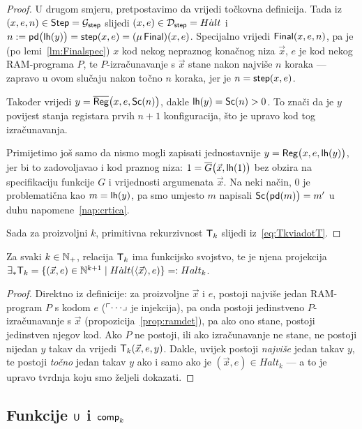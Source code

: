 \begin{proof}
U drugom smjeru, pretpostavimo da vrijedi točkovna definicija. Tada iz $(x,e,n)\in\mathsf{Step}=\mathcal G_{\mathsf{step}}$ slijedi $(x,e)\in\mathcal D_{\mathsf{step}}=H\dot alt$ i $n:=\mathsf{pd}\bigl(\mathsf{lh}(y)\bigr)=\mathsf{step}(x,e)=(\mu\,\mathsf{Final})(x,e)$. Specijalno vrijedi $\mathsf{Final}(x,e,n)$, pa je (po lemi~\ref{lm:Finalspec}) $x$ kod nekog nepraznog konačnog niza $\vec x$, $e$ je kod nekog RAM-programa $P$, te $P$-izračunavanje s $\vec x$ stane nakon najviše $n$ koraka --- zapravo u ovom slučaju nakon točno $n$ koraka, jer je $n=\mathsf{step}(x,e)$.

Također vrijedi $y=\overline{\mathsf{Reg}}\bigl(x,e,\mathsf{Sc}(n)\bigr)$, dakle $\mathsf{lh}(y)=\mathsf{Sc}(n)>0$. To znači da je $y$ povijest stanja registara prvih $n+1$ konfiguracija, što je upravo kod tog izračunavanja.

Primijetimo još samo da nismo mogli zapisati jednostavnije $y=\mathsf{Reg}\bigl(x,e,\mathsf{lh}(y)\bigr)$, jer bi to zadovoljavao i kod praznog niza: $1=\overline G\bigl(\vec x,\mathsf{lh}(1)\bigr)$ bez obzira na specifikaciju funkcije $G$ i vrijednosti argumenata $\vec x$. Na neki način, $0$ je problematična kao $m=\mathsf{lh}(y)$, pa smo umjesto $m$ napisali $\mathsf{Sc}\bigl(\mathsf{pd}(m)\bigr)=m'$ u duhu napomene~\ref{nap:crtica}.

Sada za proizvoljni $k$, primitivna rekurzivnost $\mathsf T_k$ slijedi iz~\eqref{eq:TkviadotT}.
\end{proof}

\begin{korolar}\label{kor:funHaltTk}
    Za svaki $k\in{\mathbb N}_+$, relacija $\mathsf T_k$ ima funkcijsko svojstvo, te je njena projekcija $\exists_*\mathsf T_k=\{(\vec x,e)\in{\mathbb N}^{k+1}\mid H\dot alt(\langle\vec x\rangle,e)\}=:Halt_k$.
\end{korolar}
\begin{proof}
Direktno iz definicije: za proizvoljne $\vec x$ i $e$, postoji najviše jedan RAM-program $P$ s kodom $e$ ($\ulcorner\cdots\lrcorner$ je injekcija), pa onda postoji jedinstveno $P$-izračunavanje s $\vec x$ (propozicija~\ref{prop:ramdet}), pa ako ono stane, postoji jedinstven njegov kod. Ako $P$ ne postoji, ili ako izračunavanje ne stane, ne postoji nijedan $y$ takav da vrijedi $\mathsf T_k(\vec x,e,y)$. Dakle, uvijek postoji \emph{najviše} jedan takav $y$, te postoji \emph{točno} jedan takav $y$ ako i samo ako je $(\vec x,e)\in Halt_k$ --- a to je upravo tvrdnja koju smo željeli dokazati.
\end{proof}

\subsection{Funkcije \texorpdfstring{$\mathsf U$ i $\mathsf{comp}_k$}{U i comp}}


